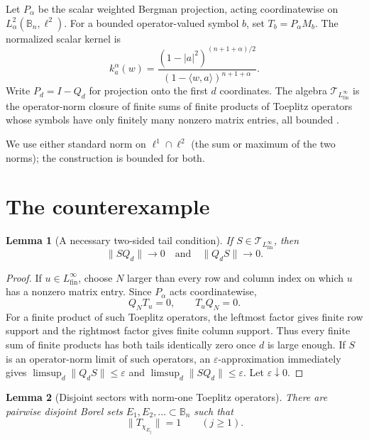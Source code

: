 \documentclass[11pt]{article}
\newtheorem{lemma}{Lemma}
\newcommand{\Bn}{\mathbb B_n}
\newcommand{\Lfin}{L^\infty_{\mathrm{fin}}}
\newcommand{\Tfin}{\mathcal T_{L^\infty_{\mathrm{fin}}}}
\begin{document}
Let $P_\alpha$ be the scalar weighted Bergman projection, acting coordinatewise
on $L^2_\alpha(\Bn,\ell^2)$.  For a bounded operator-valued symbol $b$, set
$T_b=P_\alpha M_b$.  The normalized scalar kernel is
\[
 k_a^\alpha(w)=
 \frac{(1-|a|^2)^{(n+1+\alpha)/2}}
 {(1-\langle w,a\rangle)^{n+1+\alpha}}.
\]
Write $P_d=I-Q_d$ for projection onto the first $d$ coordinates.
The algebra $\Tfin$ is the operator-norm closure of finite sums of finite
products of Toeplitz operators whose symbols have only finitely many nonzero
matrix entries, all bounded \cite{BDT}.

We use either standard norm on $\ell^1\cap\ell^2$ (the sum or maximum of the
two norms); the construction is bounded for both.

\section{The counterexample}

\begin{lemma}[A necessary two-sided tail condition]\label{lem:tails}
If $S\in\Tfin$, then
\[
 \|SQ_d\|\longrightarrow0
 \quad\text{and}\quad
 \|Q_dS\|\longrightarrow0.
\]
\end{lemma}

\begin{proof}
If $u\in\Lfin$, choose $N$ larger than every row and column index on which
$u$ has a nonzero matrix entry.  Since $P_\alpha$ acts coordinatewise,
\[
 Q_NT_u=0,\qquad T_uQ_N=0.
\]
For a finite product of such Toeplitz operators, the leftmost factor gives
finite row support and the rightmost factor gives finite column support.
Thus every finite sum of finite products has both tails identically zero once
$d$ is large enough.  If $S$ is an operator-norm limit of such operators, an
$\varepsilon$-approximation immediately gives
$\limsup_d\|Q_dS\|\leq\varepsilon$ and
$\limsup_d\|SQ_d\|\leq\varepsilon$.  Let $\varepsilon\downarrow0$.
\end{proof}

\begin{lemma}[Disjoint sectors with norm-one Toeplitz operators]
There are pairwise disjoint Borel sets $E_1,E_2,\ldots\subset\Bn$ such that
\[
 \|T_{\chi_{E_j}}\|=1\qquad(j\geq1).
\]
\end{lemma}
\end{document}
